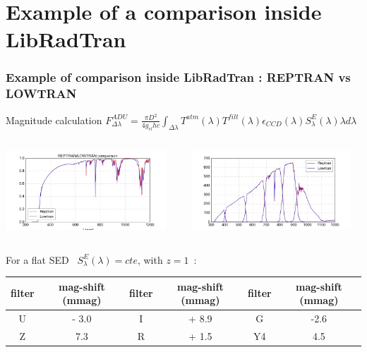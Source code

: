 \documentclass{beamer}
\begin{document}
\section{Example of a comparison inside LibRadTran}
\begin{frame}
\frametitle{Example of  comparison inside LibRadTran : REPTRAN vs LOWTRAN}
\begin{block}{Magnitude calculation}
$F_{\Delta \lambda}^{ADU} =\frac{\pi D^2}{4 g_{el} h c} \int_{\Delta \lambda} T^{atm}(\lambda) T^{filt}(\lambda) \epsilon_{CCD}(\lambda) S^E_\lambda(\lambda) \lambda d\lambda$
\end{block}
\begin{columns}
\begin{column}{0.5\textwidth}
 \includegraphics[width=6cm]{images/airtransp.jpg}
\end{column}
\begin{column}{0.5\textwidth}
\includegraphics[width=6cm]{images/compmagnit.jpg}      
\end{column}
\end{columns}
\begin{example}
{\scriptsize
For a flat SED~ $S^E_\lambda (\lambda)= cte$, with $z=1$~:
\begin{tabular}{| cc | cc |  cc |}  \hline
filter & mag-shift (mmag) & filter & mag-shift (mmag) & filter & mag-shift (mmag) \\ \hline
U & - 3.0  & I & + 8.9 & G & -2.6  \\
 Z & 7.3  &  R & + 1.5 &  Y4 & 4.5 \\ \hline
\end{tabular}
}
\end{example}
\end{frame}


\end{document}

